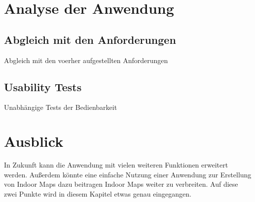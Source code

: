 \section{Analyse der Anwendung}
\subsection{Abgleich mit den Anforderungen}
Abgleich mit den voerher aufgestellten Anforderungen
\subsection{Usability Tests}
Unabhängige Tests der Bedienbarkeit

\section{Ausblick}
In Zukunft kann die Anwendung mit vielen weiteren Funktionen erweitert werden.
Außerdem könnte eine einfache Nutzung einer Anwendung zur Erstellung von Indoor Maps dazu beitragen Indoor Maps weiter zu verbreiten.
Auf diese zwei Punkte wird in diesem Kapitel etwas genau eingegangen.

